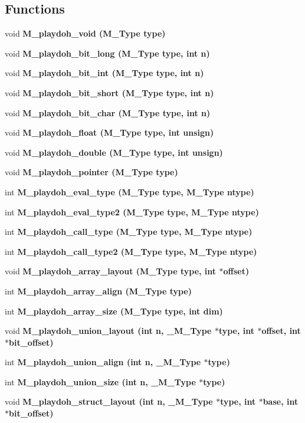 \subsection*{Functions}
\begin{CompactItemize}
\item 
void \bf{M\_\-playdoh\_\-void} (\bf{M\_\-Type} type)
\item 
void \bf{M\_\-playdoh\_\-bit\_\-long} (\bf{M\_\-Type} type, int n)
\item 
void \bf{M\_\-playdoh\_\-bit\_\-int} (\bf{M\_\-Type} type, int n)
\item 
void \bf{M\_\-playdoh\_\-bit\_\-short} (\bf{M\_\-Type} type, int n)
\item 
void \bf{M\_\-playdoh\_\-bit\_\-char} (\bf{M\_\-Type} type, int n)
\item 
void \bf{M\_\-playdoh\_\-float} (\bf{M\_\-Type} type, int unsign)
\item 
void \bf{M\_\-playdoh\_\-double} (\bf{M\_\-Type} type, int unsign)
\item 
void \bf{M\_\-playdoh\_\-pointer} (\bf{M\_\-Type} type)
\item 
int \bf{M\_\-playdoh\_\-eval\_\-type} (\bf{M\_\-Type} type, \bf{M\_\-Type} ntype)
\item 
int \bf{M\_\-playdoh\_\-eval\_\-type2} (\bf{M\_\-Type} type, \bf{M\_\-Type} ntype)
\item 
int \bf{M\_\-playdoh\_\-call\_\-type} (\bf{M\_\-Type} type, \bf{M\_\-Type} ntype)
\item 
int \bf{M\_\-playdoh\_\-call\_\-type2} (\bf{M\_\-Type} type, \bf{M\_\-Type} ntype)
\item 
void \bf{M\_\-playdoh\_\-array\_\-layout} (\bf{M\_\-Type} type, int $\ast$offset)
\item 
int \bf{M\_\-playdoh\_\-array\_\-align} (\bf{M\_\-Type} type)
\item 
int \bf{M\_\-playdoh\_\-array\_\-size} (\bf{M\_\-Type} type, int dim)
\item 
void \bf{M\_\-playdoh\_\-union\_\-layout} (int n, \bf{\_\-M\_\-Type} $\ast$type, int $\ast$offset, int $\ast$bit\_\-offset)
\item 
int \bf{M\_\-playdoh\_\-union\_\-align} (int n, \bf{\_\-M\_\-Type} $\ast$type)
\item 
int \bf{M\_\-playdoh\_\-union\_\-size} (int n, \bf{\_\-M\_\-Type} $\ast$type)
\item 
void \bf{M\_\-playdoh\_\-struct\_\-layout} (int n, \bf{\_\-M\_\-Type} $\ast$type, int $\ast$base, int $\ast$bit\_\-offset)
\item 

\end{CompactItemize}

